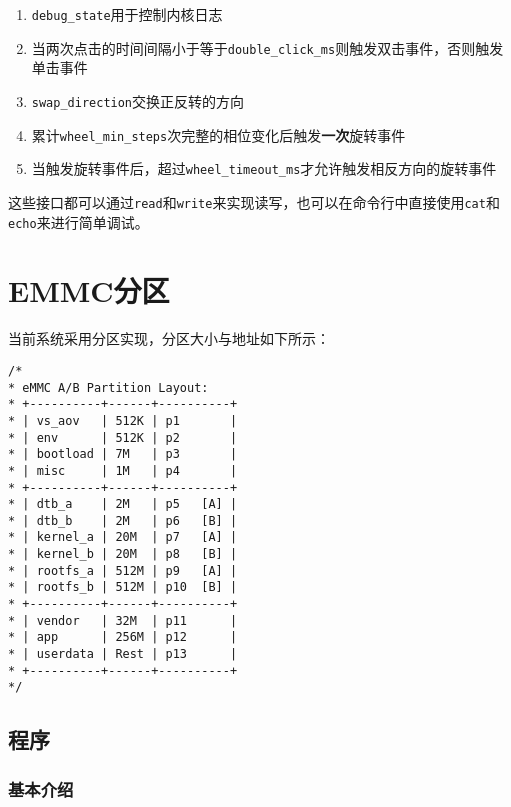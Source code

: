 \documentclass[UTF8]{ctexart}
\newcommand{\code}[1]{\colorbox{gray!10}{\lstinline[style=inlinecode]|#1|}}
\begin{document}
\begin{enumerate}
    \item \code{debug_state}用于控制内核日志
    \item 当两次点击的时间间隔小于等于\code{double_click_ms}则触发双击事件，否则触发单击事件
    \item \code{swap_direction}交换正反转的方向
    \item 累计\code{wheel_min_steps}次完整的相位变化后触发\textbf{一次}旋转事件
    \item 当触发旋转事件后，超过\code{wheel_timeout_ms}才允许触发相反方向的旋转事件
\end{enumerate}

\noindent 这些接口都可以通过\code{read}和\code{write}来实现读写，也可以在命令行中直接使用\code{cat}和\code{echo}来进行简单调试。

\newpage


\section{EMMC分区}

当前系统采用分区实现，分区大小与地址如下所示：

\begin{lstlisting}
/*
* eMMC A/B Partition Layout:
* +----------+------+----------+
* | vs_aov   | 512K | p1       |
* | env      | 512K | p2       |
* | bootload | 7M   | p3       |
* | misc     | 1M   | p4       |
* +----------+------+----------+
* | dtb_a    | 2M   | p5   [A] |
* | dtb_b    | 2M   | p6   [B] |
* | kernel_a | 20M  | p7   [A] |
* | kernel_b | 20M  | p8   [B] |
* | rootfs_a | 512M | p9   [A] |
* | rootfs_b | 512M | p10  [B] |
* +----------+------+----------+
* | vendor   | 32M  | p11      |
* | app      | 256M | p12      |
* | userdata | Rest | p13      |
* +----------+------+----------+
*/  
\end{lstlisting}

\subsection{程序}

\subsubsection{基本介绍}
\end{document}
